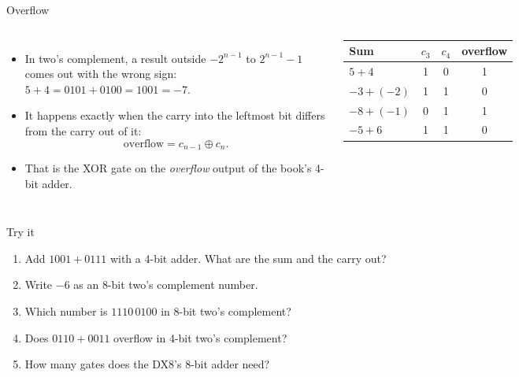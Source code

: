 \documentclass[10pt]{wosm-slides}
\begin{document}
\begin{frame}{Overflow}
  \begin{columns}[T, totalwidth=\textwidth]
      \begin{itemize}
        \item In two's complement, a result outside $-2^{n-1}$ to $2^{n-1} - 1$ comes
          out with the wrong sign: $5 + 4 = 0101 + 0100 = 1001 = -7$.
        \item It happens exactly when the carry into the leftmost bit differs from
          the carry out of it:
          \[ \text{overflow} = c_{n-1} \oplus c_n. \]
        \item That is the XOR gate on the \emph{overflow} output of the book's 4-bit
          adder.
      \end{itemize}
      \centering
      \small
      \begin{tabular}{@{}lccc@{}}
        \toprule
        Sum & $c_3$ & $c_4$ & overflow \\
        \midrule
        $5 + 4$ & 1 & 0 & 1 \\
        $-3 + (-2)$ & 1 & 1 & 0 \\
        $-8 + (-1)$ & 0 & 1 & 1 \\
        $-5 + 6$ & 1 & 1 & 0 \\
        \bottomrule
      \end{tabular}\par\medskip
  \end{columns}
\end{frame}

\begin{frame}{Try it}
  \begin{enumerate}
    \item Add $1001 + 0111$ with a 4-bit adder. What are the sum and the carry out?\par
    \item Write $-6$ as an 8-bit two's complement number.\par
    \item Which number is $1110\,0100$ in 8-bit two's complement?\par
    \item Does $0110 + 0011$ overflow in 4-bit two's complement?\par
    \item How many gates does the DX8's 8-bit adder need?\par
  \end{enumerate}
\end{frame}
\end{document}
